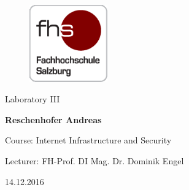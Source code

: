 
\begin{titlepage}

\hspace{7cm}

\begin{figure}[!ht]
	\centering
	\includegraphics[width=0.3\textwidth]{fhs_logo_web.png}
\end{figure}

\begin{center}
	\vspace{2cm}
	\Huge Laboratory III
	
	\Large{\bf\large Reschenhofer Andreas}
	\vspace{8cm}

	\large Course: Internet Infrastructure and Security 
	
	\large Lecturer: FH-Prof. DI Mag. Dr. Dominik Engel 
	
	\large 14.12.2016
\end{center}

\end{titlepage}